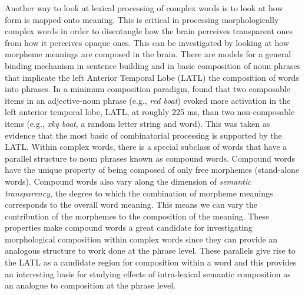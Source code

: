 \documentclass{frontiersSCNS}
\begin{document}
	Another way to look at lexical processing of complex words is to look at how form is mapped onto meaning. This is critical in processing morphologically complex words in order to disentangle how the brain perceives transparent ones from how it perceives opaque ones. This can be investigated by looking at how morpheme meanings are composed in the brain. There are models for a general binding mechanism in sentence building \citep*{Friederici:2000} and in basic composition of noun phrases \citep*{Bemis:2011} that implicate the left Anterior Temporal Lobe (LATL) the composition of words into phrases. In a minimum composition paradigm, \citet{Bemis:2011} found that two composable items in an adjective-noun phrase (e.g., \textit{red boat}) evoked more activation in the left anterior temporal lobe, LATL, at roughly 225 ms, than two non-composable items (e.g., \textit{xkq boat}, a random letter string and word). This was taken as evidence that the most basic of combinatorial processing is supported by the LATL. Within complex words, there is a special subclass of words that have a parallel structure to noun phrases known as compound words. Compound words have the unique property of being composed of only free morphemes (stand-alone words). Compound words also vary along the dimension of \textit{semantic transparency}, the degree to which the combination of morpheme meanings corresponds to the overall word meaning. This means we can vary the contribution of the morphemes to the composition of the meaning. These properties make compound words a great candidate for investigating morphological composition within complex words since they can provide an analogous structure to work done at the phrase level. These parallels give rise to the LATL as a candidate region for composition within a word and this provides an interesting basis for studying effects of intra-lexical semantic composition as an analogue to composition at the phrase level.
\end{document}
